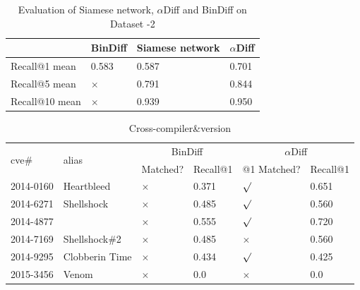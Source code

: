 \begin{table}[!t]
\newcommand{\tabincell}[2]{\begin{tabular}{@{}#1@{}}#2\end{tabular}}
\caption{Evaluation of Siamese network, $\alpha$Diff and BinDiff on Dataset \uppercase\expandafter{}-2}
\centering
\begin{tabular}{p{2cm}|p{1.8cm}|p{2cm}|p{1.8cm}}  
\hline  
\hline  
  & BinDiff & Siamese network & $\alpha$Diff \\
\hline
Recall@1 mean & 0.583 & 0.587 & 0.701 \\  
\hline  
Recall@5 mean & $\times$ & 0.791 & 0.844 \\ 
\hline
Recall@10 mean & $\times$ & 0.939 & 0.950 \\  
\hline  
\hline  
\end{tabular}  
\end{table}

\begin{table}[!t]
\newcommand{\tabincell}[2]{\begin{tabular}{@{}#1@{}}#2\end{tabular}}
\caption{Cross-compiler\&version}
\centering
\begin{tabular}{p{1.3cm}|p{1.2cm}|p{1cm}|p{1.0cm}|p{1.7cm}|p{1.0cm}}  
\hline  
\hline
\multirow{2}{*}{cve\#} &
\multirow{2}{*}{alias} &
\multicolumn{2}{c}{BinDiff} &
\multicolumn{2}{c}{$\alpha$Diff} \\
& & Matched? & Recall@1 &@1 Matched?& Recall@1 \\
\hline
2014-0160 & Heartbleed & $\times$ & 0.371 & $\surd$ & 0.651 \\ 
\hline
2014-6271 & Shellshock & $\times$ & 0.485 & $\surd$ & 0.560 \\
\hline
2014-4877 & & $\times$ & 0.555 & $\surd$ & 0.720 \\
\hline
2014-7169 & Shellshock\#2 & $\times$ & 0.485 & $\times$ & 0.560 \\
\hline
2014-9295 & Clobberin Time & $\times$ & 0.434 & $\surd$ & 0.425 \\
\hline
2015-3456 & Venom & $\times$ & 0.0 & $\times$ & 0.0 \\
\hline  
\hline  
\end{tabular}  
\end{table}

